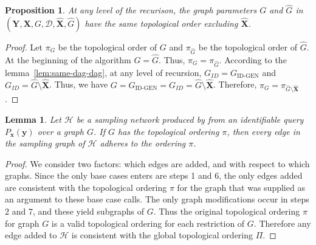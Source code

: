 \documentclass{article}
\newcommand{\h}{\mathcal{H}}
\newcommand{\x}{\mathbf{x}}
\newcommand{\y}{\mathbf{y}}
\newcommand{\X}{\mathbf{X}}
\newcommand{\Xp}{{\hat{\mathbf{X}}}}
\newcommand{\Gp}{{\hat{{G}}}}
\newcommand{\mbf}{\mathbf}
\newcommand{\data}{\mathcal{D}}
\newcommand{\idgen}{\text{ID-GEN}\xspace}
\newcommand{\idgenpar}{\idgen$(\mathbf{Y}, \mathbf{X},  G,  \data, {\Xp}, \Gp)$\xspace}
\theoremstyle{plain}
\newtheorem{proposition}[theorem]{Proposition}
\newtheorem{lemma}[theorem]{Lemma}
\theoremstyle{definition}
\theoremstyle{remark}
\begin{document}
\begin{proposition}
		\label{prop:G_Gp_same}
		At any level of the recurison, the graph parameters $G$ and $\Gp$ in \idgenpar have the same topological order excluding $\Xp$.
	\end{proposition}
	\begin{proof}
		
		Let $\pi_G$ be the topological order of $G$ and $\pi_{\Gp}$ be the topological order of $\Gp$.
		At the beginning of the algorithm $G=\Gp$. Thus, $\pi_{G} = \pi_{\Gp}$.
		According to the lemma~\ref{lem:same-dag-dag}, at any level of recursion, $G_{ID} = G_{\idgen}$ and $G_{ID}= \Gp \setminus \Xp$.
		Thus, we have $G = G_{\idgen} = G_{ID} = \Gp \setminus \Xp $.
		Therefore, $\pi_{G} = \pi_{\Gp\setminus \Xp}$.
		
		
		
	\end{proof}
	

\begin{lemma}
    \label{lem:acyclic}
    Let $\h$ be a sampling network produced by \idgen from an identifiable query $P_{\x}(\y)$ over a graph $G$. If $G$ has the topological ordering $\pi$, then every edge in the sampling graph of $\mathcal{H}$ adheres to the ordering $\pi$.
\end{lemma}
\begin{proof}
    We consider two factors: which edges are added, and with respect to which graphs. Since the only base cases \idgen enters are steps 1 and 6, the only edges added are consistent with the topological ordering $\pi$ for the graph that was supplied as an argument to these base case calls. The only graph modifications occur in steps 2 and 7, and these yield subgraphs of $G$. %
    Thus the original topological ordering $\pi$ for graph $G$ is a valid topological ordering for each restriction of $G$. Therefore any edge added to $\mathcal{H}$ is consistent with the global topological ordering $\Pi$. 
\end{proof}
\end{document}

